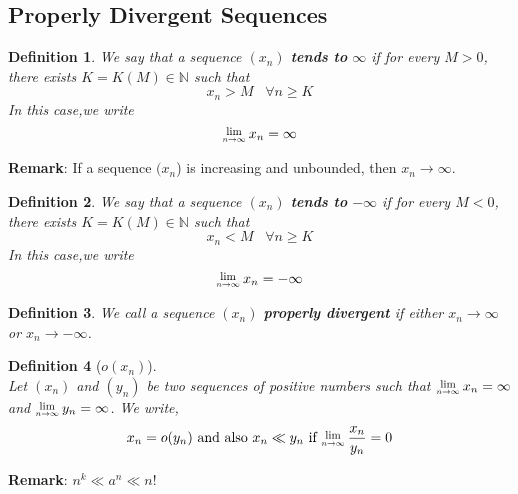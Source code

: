 \documentclass[8pt]{article}
\newcommand{\Lim}[1]{\raisebox{0.5ex}{\scalebox{0.8}{$\displaystyle \lim_{#1}\;$}}}
\newtheorem{definition}{Definition}[section]
\theoremstyle{definition}
\begin{document}
\subsection{Properly Divergent Sequences}
\begin{definition}\normalfont We say that a sequence $(x_n)$ \textbf{tends to} $\infty$ if for every $M>0$, there exists $K=K(M)\in\mathbb{N}$ such that
\[
x_n>M\;\;\;\forall n\geq K
\]
In this case,we write
\[
\Lim{n\to\infty} x_n = \infty
\]
\end{definition}
\textbf{Remark}: If a sequence $(x_n$) is increasing and unbounded, then $x_n\to\infty$.
\begin{definition}\normalfont We say that a sequence $(x_n)$ \textbf{tends to} $-\infty$ if for every $M<0$, there exists $K=K(M)\in\mathbb{N}$ such that
\[
x_n<M\;\;\;\forall n\geq K
\]
In this case,we write
\[
\Lim{n\to\infty} x_n = -\infty
\]
\end{definition}
\begin{definition}\normalfont We call a sequence $(x_n)$ \textbf{properly divergent} if either $x_n\to\infty$ or $x_n\to -\infty$.
\end{definition}
\begin{definition}[$o(x_n)$]
\hfill\\\normalfont Let $(x_n)$ and $(y_n)$ be two sequences of positive numbers such that $\Lim{n\to\infty}x_n=\infty$ and $\Lim{n\to\infty} y_n=\infty$. We write,
\[
x_n=o(y_n) \text{ and also }x_n\ll y_n\text{ if }\Lim{n\to\infty}\frac{x_n}{y_n}=0 
\] 
\end{definition}
\textbf{Remark}: $n^k\ll a^n\ll n!$
\clearpage
\end{document}
